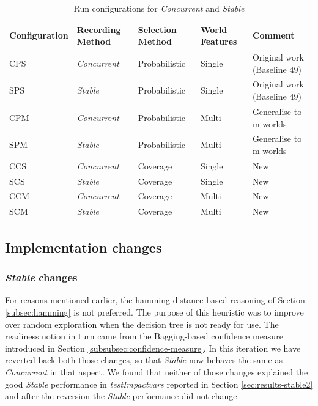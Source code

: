 \documentclass[a4paper]{article}
\newcommand{\cc}{\emph{Concurrent}\xspace}
\newcommand{\st}{\emph{Stable}\xspace}
\newcommand{\tiv}{\emph{testImpactvars}\xspace}
\newcommand{\dt}{{decision tree}\xspace}
\begin{document}
\begin{table}[!htb]
\centering
  \begin{tabular}{ p{} p{} p{} p{}p{} }
    \hline \hline
    Configuration & Recording Method & Selection Method & World Features & Comment\\ \hline
    CPS & \cc & Probabilistic & Single & Original work (Baseline 49)\\ \hline
    SPS & \st & Probabilistic & Single &  Original work (Baseline 49)\\ \hline
    CPM & \cc & Probabilistic & Multi & Generalise to m-worlds\\ \hline
    SPM & \st & Probabilistic & Multi & Generalise to m-worlds\\ \hline
    CCS & \cc & Coverage & Single & New\\ \hline
    SCS & \st & Coverage & Single & New\\ \hline
    CCM & \cc & Coverage & Multi & New\\ \hline
    SCM & \st & Coverage & Multi & New\\ \hline
  \end{tabular}
  \caption{Run configurations for \cc and \st}
  \label{tab:final-config}
\end{table}

\subsection{Implementation changes}

\subsubsection{\st changes}

For reasons mentioned earlier, the hamming-distance based reasoning of Section \ref{subsec:hamming} is not preferred. The purpose of this heuristic was to improve over random exploration when the \dt is not ready for use. The readiness notion in turn came from the Bagging-based confidence measure introduced in Section \ref{subsubsec:confidence-measure}. In this iteration we have reverted back both those changes, so that \st now behaves the same as \cc in that aspect. We found that neither of those changes explained the good \st performance in \tiv reported in Section \ref{sec:results-stable2} and after the reversion the \st performance did not change.
\end{document}

